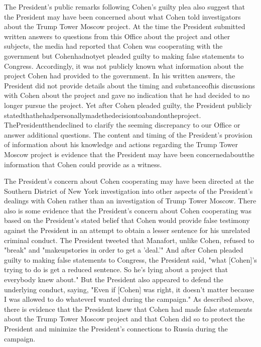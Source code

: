 {The President's public remarks following Cohen's guilty plea also suggest that the President may have been concerned about what Cohen told investigators about the Trump Tower Moscow project.
At the time the President submitted written answers to questions from this Office about the project and other subjects, the media had reported that Cohen was cooperating with the government but Cohenhadnotyet pleaded guilty to making false statements to Congress.
Accordingly, it was not publicly known what information about the project Cohen had provided to the government.
In his written answers, the President did not provide details about the timing and substanceofhis discussions with Cohen about the project and gave no indication that he had decided to no longer pursue the project.
Yet after Cohen pleaded guilty, the President publicly statedthathehadpersonallymadethedecisiontoabandontheproject.
ThePresidentthendeclined to clarify the seeming discrepancy to our Office or answer additional questions.
The content and timing of the President's provision of information about his knowledge and actions regarding the Trump Tower Moscow project is evidence that the President may have been concernedaboutthe information that Cohen could provide as a witness.

The President's concern about Cohen cooperating may have been directed at the Southern District of New York investigation into other aspects of the President's dealings with Cohen rather than an investigation of Trump Tower Moscow.
There also is some evidence that the President's concern about Cohen cooperating was based on the President's stated belief that Cohen would provide false testimony against the President in an attempt to obtain a lesser sentence for his unrelated criminal conduct.
The President tweeted that Manafort, unlike Cohen, refused to "break" and "makeupstories in order to get a 'deal.'" And after Cohen pleaded guilty to making false statements to Congress, the President said, "what [Cohen]'s trying to do is get a reduced sentence.
So he's lying about a project that everybody knew about." But the President also appeared to defend the underlying conduct, saying, "Even if [Cohen] was right, it doesn't matter because I was allowed to do whateverI wanted during the campaign."
As described above, there is evidence that the President knew that Cohen had made false statements about the Trump Tower Moscow project and that Cohen did so to protect the President and minimize the President's connections to Russia during the campaign.

}
